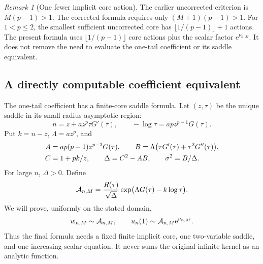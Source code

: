 \documentclass[11pt,a4paper]{article}
\numberwithin{equation}{section}
\theoremstyle{definition}
\theoremstyle{remark}
\newtheorem{remark}[theorem]{Remark}
\newcommand{\ee}{\mathrm e}\newcommand{\dd}{\mathrm d}
\begin{document}
\begin{remark}[One fewer implicit core action]
The earlier uncorrected criterion is $M(p-1)>1$. The corrected formula
requires only $(M+1)(p-1)>1$. For $1<p\le2$, the smallest sufficient
uncorrected core has $\lfloor1/(p-1)\rfloor+1$ actions. The present formula
uses $\lfloor1/(p-1)\rfloor$ core actions plus the scalar factor
$\ee^{\nu_{n,M}}$. It does not remove the need to evaluate the one-tail
coefficient or its saddle equivalent.
\end{remark}

\subsection{A directly computable coefficient equivalent}
The one-tail coefficient has a finite-core saddle formula. Let $(z,\tau)$
be the unique saddle in its small-radius asymptotic region:
\begin{equation}
 n=z+a z^p\tau G'(\tau),\qquad
 -\log\tau=apz^{p-1}G(\tau).
 \label{eq:saddle}
\end{equation}
Put $k=n-z$, $\Lambda=a z^p$, and
\begin{align}
 A&=ap(p-1)z^{p-2}G(\tau),\qquad
 B=\Lambda\bigl(\tau G'(\tau)+\tau^2G''(\tau)\bigr),\notag\\
 C&=1+pk/z,\qquad \Delta=C^2-AB,\qquad
 \sigma^2=B/\Delta.
 \label{eq:det}
\end{align}
For large $n$, $\Delta>0$. Define
\begin{equation}
 \mathcal A_{n,M}=
 \frac{R(\tau)}{\sqrt{\Delta}}
 \exp\bigl(\Lambda G(\tau)-k\log\tau\bigr).
 \label{eq:A}
\end{equation}
We will prove, uniformly on the stated domain,
\begin{equation}
 w_{n,M}\sim\Acal_{n,M},\qquad
 u_n(1)\sim\Acal_{n,M}\ee^{\nu_{n,M}}.
 \label{eq:computable}
\end{equation}
Thus the final formula needs a fixed finite implicit core, one two-variable
saddle, and one increasing scalar equation. It never sums the original
infinite kernel as an analytic function.
\end{document}
